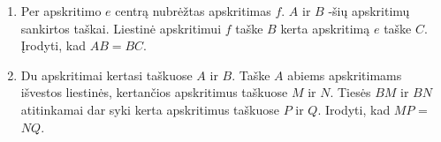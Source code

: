 \begin{enumerate}
\item Per apskritimo $e$ centrą nubrėžtas apskritimas $f$.
  $A$ ir $B$ -šių apskritimų sankirtos taškai. Liestinė
  apskritimui $f$ taške $B$  kerta apskritimą $e$ taške $C$.
  Įrodyti, kad $AB=BC$.   
\item Du apskritimai kertasi taškuose $A$ ir $B$. Taške $A$
  abiems apskritimams išvestos liestinės, kertančios
  apskritimus taškuose $M$ ir $N$. Tiesės $BM$ ir $BN$
  atitinkamai dar syki kerta apskritimus taškuose $P$ ir
  $Q$. Irodyti, kad $MP$ = $NQ$.  

\end{enumerate}
